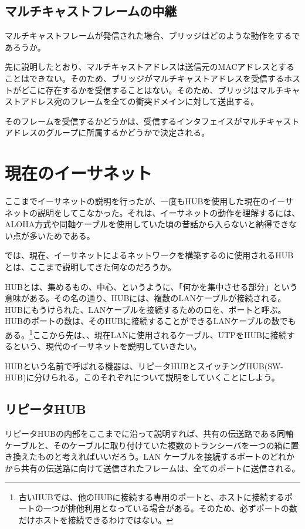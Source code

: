 \subsection{マルチキャストフレームの中継}
マルチキャストフレームが発信された場合、ブリッジはどのような動作をするであろうか。

先に説明したとおり、マルチキャストアドレスは送信元のMACアドレスとすることはできない。そのため、ブリッジがマルチキャストアドレスを受信するホストがどこに存在するかを受信することはない。そのため、ブリッジはマルチキャストアドレス宛のフレームを全ての衝突ドメインに対して送出する。

そのフレームを受信するかどうかは、受信するインタフェイスがマルチキャストアドレスのグループに所属するかどうかで決定される。


\section{現在のイーサネット}

ここまでイーサネットの説明を行ったが、一度もHUBを使用した現在のイーサネットの説明をしてこなかった。それは、イーサネットの動作を理解するには、ALOHA方式や同軸ケーブルを使用していた頃の昔話から入らないと納得できない点が多いためである。

では、現在、イーサネットによるネットワークを構築するのに使用されるHUBとは、ここまで説明してきた何なのだろうか。

HUBとは、集めるもの、中心、というように、「何かを集中させる部分」という意味がある。その名の通り、HUBには、複数のLANケーブルが接続される。HUBにもうけられた、LANケーブルを接続するための口を、ポートと呼ぶ。HUBのポートの数は、そのHUBに接続することができるLANケーブルの数でもある。\footnote{古いHUBでは、他のHUBに接続する専用のポートと、ホストに接続するポートの一つが排他利用となっている場合がある。そのため、必ずポートの数だけホストを接続できるわけではない。}ここから先は、、現在LANに使用されるケーブル、UTPをHUBに接続するという、現代のイーサネットを説明していきたい。

HUBという名前で呼ばれる機器は、リピータHUBとスイッチングHUB(SW-HUB)に分けられる。このそれぞれについて説明をしていくことにしよう。
\subsection{リピータHUB}

リピータHUBの内部をここまでに沿って説明すれば、共有の伝送路である同軸ケーブルと、そのケーブルに取り付けていた複数のトランシーバを一つの箱に置き換えたものと考えればいいだろう。LAN ケーブルを接続するポートのどれかから共有の伝送路に向けて送信されたフレームは、全てのポートに送信される。

